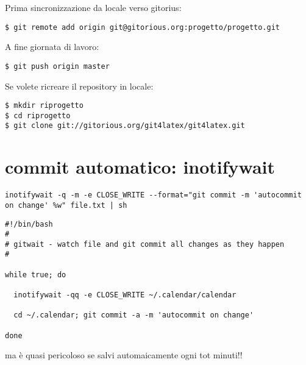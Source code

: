 \documentclass[a4paper,12pt,oneside]{article}
\begin{document}
Prima sincronizzazione da locale verso gitorius:
\begin{lstlisting}
$ git remote add origin git@gitorious.org:progetto/progetto.git
\end{lstlisting}

A fine giornata di lavoro:
\begin{lstlisting}
$ git push origin master
\end{lstlisting}

Se volete ricreare il repository in locale:
\begin{lstlisting}
$ mkdir riprogetto
$ cd riprogetto
$ git clone git://gitorious.org/git4latex/git4latex.git
\end{lstlisting}

\section{commit automatico: inotifywait}

\begin{lstlisting}
inotifywait -q -m -e CLOSE_WRITE --format="git commit -m 'autocommit on change' %w" file.txt | sh
\end{lstlisting}

\begin{lstlisting}
#!/bin/bash
#
# gitwait - watch file and git commit all changes as they happen
#

while true; do

  inotifywait -qq -e CLOSE_WRITE ~/.calendar/calendar

  cd ~/.calendar; git commit -a -m 'autocommit on change'

done
\end{lstlisting}
ma è quasi pericoloso se salvi automaicamente ogni tot minuti!!
\end{document}
